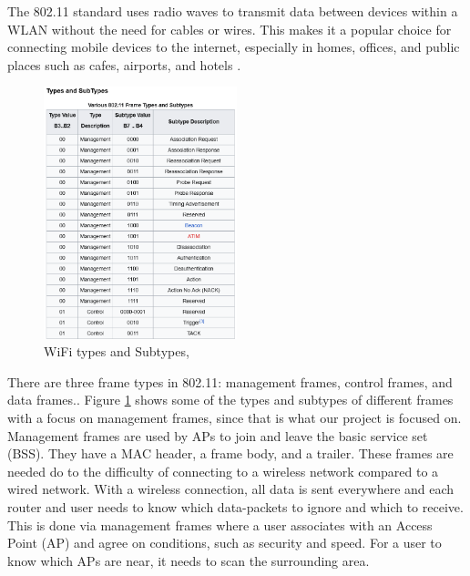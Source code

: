 The 802.11 standard uses radio waves to transmit data between devices within a WLAN without the need for cables or wires. This makes it a popular choice for connecting mobile devices to the internet, especially in homes, offices, and public places such as cafes, airports, and hotels \cite{Public_WiFi}.

\begin{figure}[!htbp]
    \centering
    \includegraphics[width=0.5\textwidth]{Latex-Files/Billeder/WiFi_Types.png}
    \caption{WiFi types and Subtypes, \cite{frame_types}}
    \label{WiFi Types}
\end{figure}

There are three frame types in 802.11: management frames, control frames, and data frames.\cite{Amit802.11frames, DefinitiveGast}. Figure \ref{WiFi Types} shows some of the types and subtypes of different frames with a focus on management frames, since that is what our project is focused on.  Management frames are used by APs to join and leave the basic service set (BSS). They have a MAC header, a frame body, and a trailer. These frames are needed do to the difficulty of connecting to a wireless network compared to a wired network. With a wireless connection, all data is sent everywhere and each router and user needs to know which data-packets to ignore and which to receive. This is done via management frames where a user associates with an Access Point (AP) and agree on conditions, such as security and speed. For a user to know which APs are near, it needs to scan the surrounding area. 

